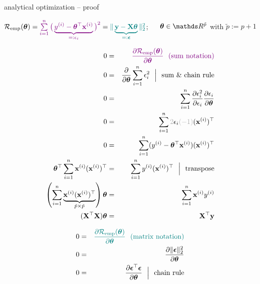 \documentclass[11pt,compress,t,notes=noshow, xcolor=table]{beamer}
\begin{document}
\begin{vbframe}{analytical optimization -- proof}

\scriptsize
$\mathcal{R}_{\text{emp}}(\bm{\theta}) = \textcolor{violet}{\sum\limits_{i=1}^n \big(\underbrace{y^{(i)} - \bm{\theta}^\top \mathbf{x}^{(i)}}_{=:
\epsilon_i} \big)^2}
= \textcolor{teal}{\| \underbrace{\mathbf{y} - \mathbf{X} \bm{\theta}}_{=: \bm{\epsilon}} 
\|^2_2}$; ~~ $\thetab \in \R^{\tilde p}$ with $\tilde p := p + 1$


\begin{minipage}[t]{0.52\textwidth}
    \tiny 
    \begin{eqnarray*}
        0 &=& \textcolor{violet}{\frac{\partial \risket}{\partial \thetab}
        ~~ \text{(sum notation)}} \\
        0 &=& \frac{\partial}{\partial \thetab} \sumin \epsilon_i^2 
        ~~ \Big \rvert
        ~~ \text{sum \& chain rule} \\
        0 &=& \sumin \frac{\partial \epsilon_i^2}{\partial \epsilon_i}
        \frac{\partial \epsilon_i}{\partial \thetab} \\
        0 &=& \sumin \textcolor{black!30}{2} \epsilon_i 
        \textcolor{black!30}{(-1)} (\xi)^\top \\ 
        0 &=& \sumin (\yi - \thetab^\top \xi)(\xi)^\top \\
        \thetab^\top \sumin  \xi (\xi)^\top &=&\sumin \yi (\xi)^\top 
        ~~ \Big \rvert ~~ \text{transpose} \\
        \left( \sumin \underbrace{\xi (\xi)^\top }_{\tilde p \times \tilde p}\right) \thetab &=& 
        \sumin \xi \yi \\
        (\Xmat^\top \Xmat) \thetab &=&  \Xmat^\top \yv
    \end{eqnarray*}
\end{minipage}
\hfill
\begin{minipage}[t]{0.45\textwidth}
    \tiny 
    \begin{eqnarray*}
        0 &=& \textcolor{teal}{\frac{\partial \risket}{\partial \thetab}
        ~~ \text{(matrix notation)}} \\
        0 &=& \frac{\partial \| \bm{\epsilon} \|_2^2 }{\partial \thetab} \\
        0 &=& \frac{\partial \bm{\epsilon}^\top \bm{\epsilon} }{\partial 
        \thetab} 
        ~~ \Big \rvert ~~ \text{chain rule} \\

\end{eqnarray*}
\end{minipage}
\end{vbframe}
\end{document}
